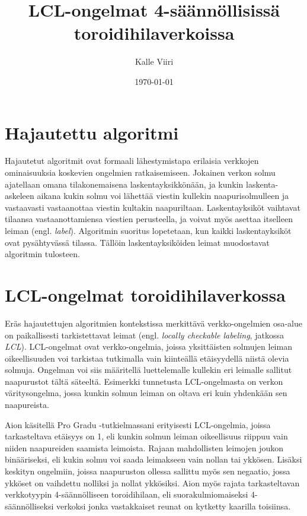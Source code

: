 \documentclass[12pt,finnish]{tktltiki2}
\title{LCL-ongelmat 4-säännöllisissä toroidihilaverkoissa}
\author{Kalle Viiri}
\date{\today}
\theoremstyle{definition}
\theoremstyle{remark}
\begin{document}


\mainmatter       %

\section{Hajautettu algoritmi}

Hajautetut algoritmit ovat formaali lähestymistapa erilaisia verkkojen ominaisuuksia koskevien ongelmien ratkaisemiseen. Jokainen verkon solmu ajatellaan omana tilakonemaisena laskentayksikkönään, ja kunkin laskenta-askeleen aikana kukin solmu voi lähettää viestin kullekin naapurisolmulleen ja vastaavasti vastaanottaa viestin kultakin naapuriltaan. Laskentayksiköt vaihtavat tilaansa vastaanottamiensa viestien perusteella, ja voivat myös asettaa itselleen leiman (engl. \textit{label}). Algoritmin suoritus lopetetaan, kun kaikki laskentayksiköt ovat pysähtyvässä tilassa. Tällöin laskentayksiköiden leimat muodostavat algoritmin tulosteen.

\section{LCL-ongelmat toroidihilaverkossa}

Eräs hajautettujen algoritmien kontekstissa merkittävä verkko-ongelmien osa-alue on paikallisesti tarkistettavat leimat (engl. \textit{locally checkable labeling}, jatkossa \textit{LCL}). LCL-ongelmat ovat verkko-ongelmia, joissa yksittäisten solmujen leiman oikeellisuuden voi tarkistaa tutkimalla vain kiinteällä etäisyydellä niistä olevia solmuja. Ongelman voi siis määritellä luettelemalle kullekin eri leimalle sallitut naapurustot tältä säteeltä. Esimerkki tunnetusta LCL-ongelmasta on verkon väritysongelma, jossa kunkin solmun leiman on oltava eri kuin yhdenkään sen naapureista.

Aion käsitellä Pro Gradu -tutkielmassani erityisesti LCL-ongelmia, joissa tarkasteltava etäisyys on 1, eli kunkin solmun leiman oikeellisuus riippuu vain niiden naapureiden saamista leimoista. Rajaan mahdollisten leimojen joukon binääriseksi, eli kukin solmu voi saada leimakseen vain nollan tai ykkösen. Lisäksi keskityn ongelmiin, joissa naapuruston ollessa sallittu myös sen negaatio, jossa ykköset on vaihdettu nolliksi ja nollat ykkösiksi. Aion myös rajata tarkasteltavan verkkotyypin 4-säännölliseen toroidihilaan, eli suorakulmiomaiseksi 4-säännölliseksi verkoksi jonka vastakkaiset reunat on kytketty kaarilla toisiinsa.
\end{document}
